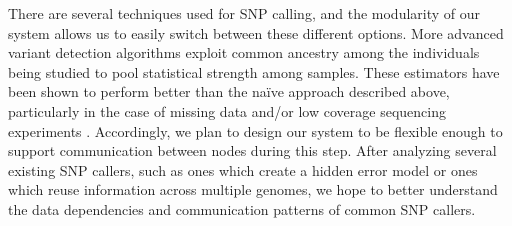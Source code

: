 \documentclass[12pt]{article}
\begin{document}
%
There are several techniques used for SNP calling,
and the modularity of our system allows us to easily switch between these
different options.  More advanced variant detection algorithms exploit common
ancestry among the individuals being studied to pool statistical strength among
samples.  These estimators have been shown to perform better than the na\"{i}ve
approach described above, particularly in the case of missing data and/or low
coverage sequencing experiments \cite{nielsen}.  Accordingly, we plan to design
our system to be flexible enough to support communication between nodes during
this step.  After analyzing several existing SNP callers, such as ones which
create a hidden error model or ones which reuse information across multiple
genomes, we hope to better understand the data dependencies and communication
patterns of common SNP callers.  

\end{document}
